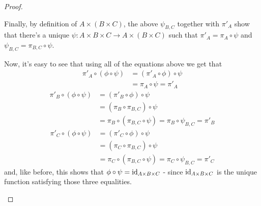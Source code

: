 \begin{proof}
\begin{enumerate}[(a)]
		Finally, by definition of $A\times (B\times C)$, the above $\psi_{B,C}$ together with $\pi'_A$ show that there's a unique $\psi:A\times B\times C\to A\times(B\times C)$ such that $\pi'_A=\pi_A\circ\psi$ and $\psi_{B,C}=\pi_{B,C}\circ\psi$.
		
		Now, it's easy to see that using all of the equations above we get that
		\begin{align*}
			\pi'_A\circ(\phi\circ\psi)&=(\pi'_A\circ\phi)\circ\psi\\&=\pi_A\circ\psi=\pi'_A
		\end{align*}
		\begin{align*}
		\pi'_B\circ(\phi\circ\psi)&=(\pi'_B\circ\phi)\circ\psi\\
		&=(\pi_B\circ\pi_{B,C})\circ\psi\\
		&=\pi_B\circ(\pi_{B,C}\circ\psi)=\pi_B\circ\psi_{B,C}=\pi'_B
		\end{align*}
		\begin{align*}
		\pi'_C\circ(\phi\circ\psi)&=(\pi'_C\circ\phi)\circ\psi\\
		&=(\pi_C\circ\pi_{B,C})\circ\psi\\
		&=\pi_C\circ(\pi_{B,C}\circ\psi)=\pi_C\circ\psi_{B,C}=\pi'_C
		\end{align*}and, like before, this shows that $\phi\circ\psi={\rm id}_{A\times B\times C}$ - since ${\rm id}_{A\times B\times C}$ is the unique function satisfying those three equalities.
		

\end{enumerate}
\end{proof}
